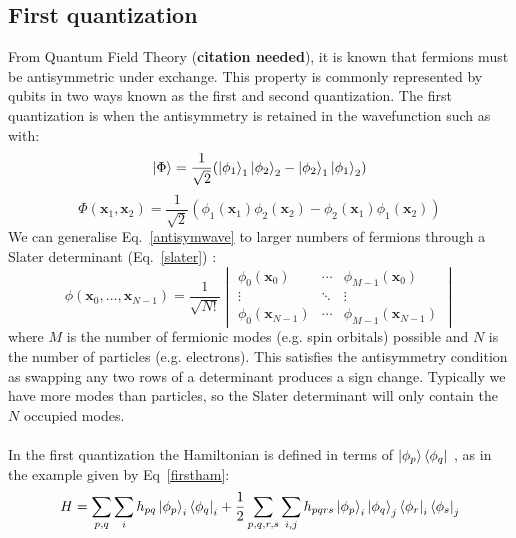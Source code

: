 \documentclass[twoside]{article}
\begin{document}
\subsection{First quantization}
From Quantum Field Theory (\textbf{citation needed}), it is known that fermions must be antisymmetric under exchange. This property is commonly represented by qubits in two ways known as the first and second quantization. The first quantization is when the antisymmetry is retained in the wavefunction such as with:
\begin{equation}\label{antisym}
        \ket{\Phi} = \frac{1}{\sqrt{2}}(\ket{\phi_1}_1 \ket{\phi_2}_2 - \ket{\phi_2}_1 \ket{\phi_1}_2)
\end{equation}
\begin{equation}\label{antisymwave}
        \Phi(\bm x_1, \bm x_2) = \frac{1}{\sqrt{2}}(\phi_1(\bm x_1) \phi_2(\bm x_2) - \phi_2(\bm x_1) \phi_1(\bm x_2))
\end{equation}
We can generalise Eq.~\ref{antisymwave} to larger numbers of fermions through a Slater determinant (Eq.~\ref{slater}) \cite{chemistryReview}:
\begin{equation}\label{slater}
        \phi(\bm x_0, ..., \bm x_{N-1}) = \frac{1}{\sqrt{N!}} 
        \begin{vmatrix} 
                \phi_0(\bm x_0) & \cdots & \phi_{M-1}(\bm x_0)\\
                \vdots & \ddots & \vdots \\
                \phi_0(\bm x_{N-1}) & \cdots & \phi_{M-1}(\bm x_{N-1})
        \end{vmatrix}
\end{equation}
where $M$ is the number of fermionic modes (e.g. spin orbitals) possible and $N$ is the number of particles (e.g. electrons). This satisfies the antisymmetry condition as swapping any two rows of a determinant produces a sign change. Typically we have more modes than particles, so the Slater determinant will only contain the $N$ occupied modes.\\\\ 
 In the first quantization the Hamiltonian is defined in terms of $\ket{\phi_p}\bra{\phi_q}$ \cite{tilly}, as in the example given by Eq~\ref{firstham}:
\begin{equation}
        \label{firstham}
        H = \sum_{p, q} \sum_i h_{pq}  \ket{\phi_p}_i \bra{\phi_q}_i + \frac{1}{2} \sum_{p,q,r,s}\sum_{i,j} h_{pqrs} \ket{\phi_p}_i \ket{\phi_q}_j \bra{\phi_r}_i \bra{\phi_s}_j
\end{equation}
\end{document}
